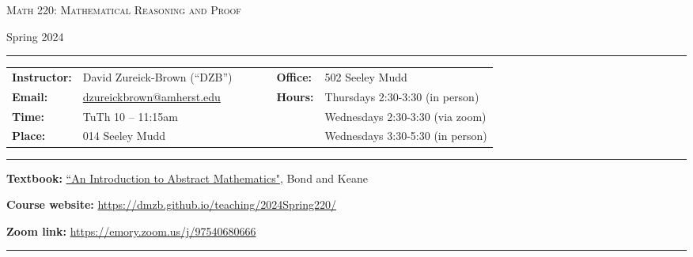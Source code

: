 \documentclass[12pt]{article}
\begin{document}
\begin{center}
{\Large \textsc{Math 220: Mathematical Reasoning and Proof}}
\end{center}
\begin{center}
  Spring 2024
\end{center}

\hrule \smallskip

\noindent \begin{tabular}{@{}llcccll}
\textbf{Instructor:} & David Zureick-Brown (``DZB'') & & & & \textbf{Office:} & 502 Seeley Mudd \\
 \textbf{Email:} & \href{mailto: dzureickbrown@amherst.edu}{dzureickbrown@amherst.edu} & & & & \textbf{Hours:} & Thursdays 2:30-3:30 (in person)\\
 \textbf{Time:} & TuTh 10 -- 11:15am & & & & &Wednesdays 2:30-3:30 (via zoom) \\
 \textbf{Place:} & 014 Seeley Mudd & & & & & Wednesdays 3:30-5:30 (in person)
\end{tabular}



\smallskip \hrule \medskip

\noindent\textbf{Textbook:} 
\href{https://www.amazon.com/Introduction-Abstract-Mathematics-Robert-Bond/dp/1577665392}{``An Introduction to Abstract Mathematics"}, Bond and Keane
\medskip

\noindent\textbf{Course website:} \url{https://dmzb.github.io/teaching/2024Spring220/}
\medskip

\noindent\textbf{Zoom link:} \url{https://emory.zoom.us/j/97540680666}

 \smallskip 

\hrule  \smallskip

\end{document}
